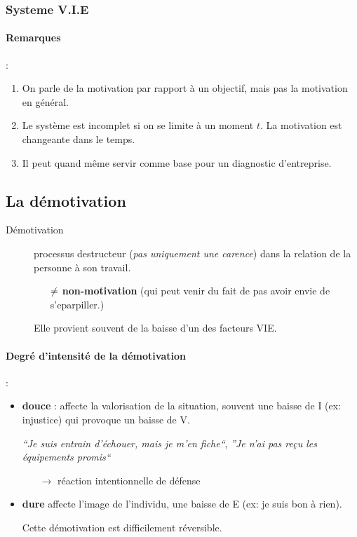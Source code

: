 \documentclass[11pt]{article} %
\begin{document}
\subsubsection{Systeme V.I.E}
\paragraph{Remarques }:
\begin{enumerate}
   \item On parle de la motivation par rapport à un objectif, mais pas
       la motivation en général.
   \item Le système est incomplet si on se limite à un moment $t$. La
       motivation est changeante dans le temps.
   \item Il peut quand même servir comme base pour un diagnostic
       d'entreprise.
\end{enumerate}

\subsection{La démotivation}

\begin{description}
	\item[Démotivation] processus destructeur (\textit{pas uniquement
        une carence}) dans la relation de la personne à son travail.
        
        \begin{itemize}
            \item[$\bf\neq$] \textbf{non-motivation} (qui peut venir du fait de pas avoir
envie de s'eparpiller.)
        \end{itemize}
        
        Elle provient souvent de la baisse d'un des facteurs VIE.
\end{description} 

\paragraph{Degré d'intensité de la démotivation} :
\begin{itemize}
	\item \textbf{douce} : affecte la valorisation de la situation,
        souvent une baisse de I (ex: injustice) qui provoque un baisse
        de V.

        \textit{``Je suis entrain d'échouer, mais je m'en fiche``}, 
        \textit{''Je n'ai pas reçu les équipements promis``} 

        \begin{itemize}
            \item[$\to$] réaction intentionnelle de défense
        \end{itemize}

    \item \textbf{dure} affecte l'image de l'individu, une baisse de E
        (ex: je suis bon à rien). 
        
        Cette démotivation est difficilement réversible.
\end{itemize}
\end{document}
